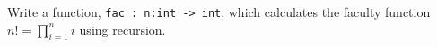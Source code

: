 Write a function, \lstinline{fac : n:int -> int}, which calculates the faculty function $n! = \prod_{i=1}^ni$ using recursion.

